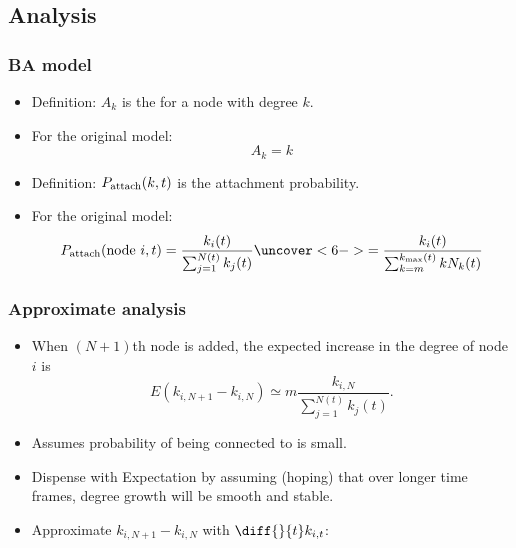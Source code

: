 \subsection{Analysis}

\begin{frame}[label=]
 \frametitle{BA model}  
 
 \begin{itemize}
 \item<1->
   \alert{Definition:} $A_k$ is the 
   for a node with degree $k$.
 \item<2->
     For the original model:
     $$ A_k = k$$
 \item<3->
   \alert{Definition:} $P_{\textnormal{attach}}(k,t)$ 
   is the attachment probability.
 \item<4->
     For the original model:
     $$
     P_{\textnormal{attach}}(\mbox{node $i$},t)
     =
     \frac{k_i(t)}
     {
     \sum_{j=1}^{N(t)} k_j(t)
     }
     \uncover<6->{
       =
       \frac{k_i(t)}
       {
         \sum_{k=m}^{k_{\textnormal{max}}(t)} k N_k(t)
       }
     }
     $$
 \end{itemize}

\end{frame}

\begin{frame}[label=]
 \frametitle{Approximate analysis}  

 \begin{itemize}
 \item<1->
   When $(N+1)$th node is added, 
   the expected increase in the degree of node $i$ is 
   $$
   E(k_{i,N+1} - k_{i,N}) 
   \simeq 
   m
   \frac{k_{i,N}}
   {
     \sum_{j=1}^{N(t)} k_j(t)
   }.
   $$
 \item<2->
   Assumes probability of being connected to is \alert{small}.
 \item<3->
   Dispense with Expectation by assuming (hoping)
   that over longer time frames, degree growth will
   be smooth and stable.
 \item<4->
   Approximate 
   $k_{i,N+1} - k_{i,N}$ with $\diff{}{t} k_{i,t}$:
 \end{itemize}
\end{frame}

